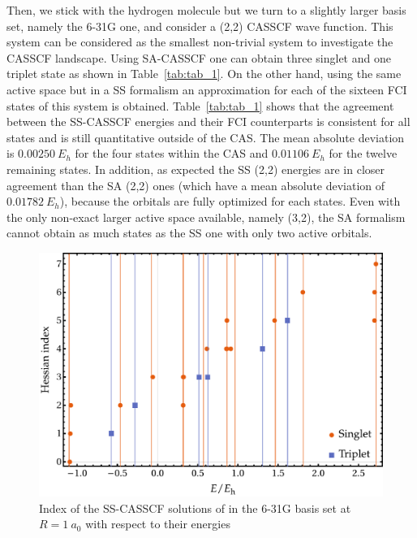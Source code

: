 \documentclass[aps,prb,reprint,showkeys,superscriptaddress]{revtex4-1}
\begin{document}
Then, we stick with the hydrogen molecule but we turn to a slightly larger basis set, namely the 6-31G one, \cite{Ditchfield_1971} and consider a (2,2) CASSCF wave function.
This system can be considered as the smallest non-trivial system to investigate the CASSCF landscape.
Using SA-CASSCF one can obtain three singlet and one triplet state as shown in Table~\ref{tab:tab_1}.
On the other hand, using the same active space but in a SS formalism an approximation for each of the sixteen FCI states of this system is obtained.
Table~\ref{tab:tab_1} shows that the agreement between the SS-CASSCF energies and their FCI counterparts is consistent for all states and is still quantitative outside of the CAS.
The mean absolute deviation is $0.00250~E_h$ for the four states within the CAS and $0.01106~E_h$ for the twelve remaining states.
In addition, as expected the SS (2,2) energies are in closer agreement than the SA (2,2) ones (which have a mean absolute deviation of $0.01782~E_h$), because the orbitals are fully optimized for each states.
Even with the only non-exact larger active space available, namely (3,2), the SA formalism cannot obtain as much states as the SS one with only two active orbitals.

\begin{figure}
  \includegraphics[width=0.9\linewidth]{Figures/fig_3a.pdf}
  \caption{Index of the SS-CASSCF solutions of  in the 6-31G basis set at $R=1~a_0$ with respect to their energies
    \label{fig:fig_2}}
\end{figure}
\end{document}
